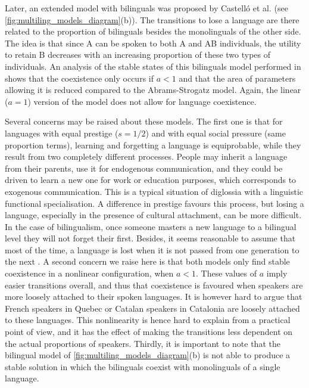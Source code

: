 \documentclass[../thesis.tex]{subfiles}
\begin{document}
Later, an extended model with bilinguals was proposed by Castell\'o et al.
\cite{CastelloOrderingDynamics2006} (see \cref{fig:multiling_models_diagram}(b)). The transitions
to lose a language are there related to the proportion of bilinguals besides the
monolinguals of the other side. The idea is that since A can be spoken to both A and AB
individuals, the utility to retain B decreases with an increasing proportion of these
two types of individuals. An analysis of the stable states of this bilinguals model
performed in \cite{VazquezAgentBased2010} shows that the coexistence only occurs if $a <
1$ and that the area of parameters allowing it is reduced compared to the
Abrams-Strogatz model. Again, the linear ($a = 1$) version of the model does not allow
for language coexistence.

Several concerns may be raised about these models. The first one is that for languages
with equal prestige ($s = 1/2$) and with equal social pressure (same proportion terms),
learning and forgetting a language is equiprobable, while they result from two
completely different processes. People may inherit a language from their parents, use it
for endogenous communication, and they could be driven to learn a new one for work or
education purposes, which corresponds to exogenous communication. This is a typical
situation of diglossia \cite{FergusonDiglossia1959} with a linguistic functional
specialisation. A difference in prestige favours this process, but losing a language,
especially in the presence of cultural attachment, can be more difficult. In the case of
bilingualism, once someone masters a new language to a bilingual level they will not
forget their first. Besides, it seems reasonable to assume that most of the time, a
language is lost when it is not passed from one generation to the next
\cite{CrystalLanguageDeath2000,PortesPluribusUnum1998}. A second concern we raise here
is that both models only find stable coexistence in a nonlinear configuration, when $a <
1$. These values of $a$ imply easier transitions overall, and thus that coexistence is
favoured when speakers are more loosely attached to their spoken languages. It is
however hard to argue that French speakers in Quebec or Catalan speakers in Catalonia
are loosely attached to these languages. This nonlinearity is hence hard to explain from
a practical point of view, and it has the effect of making the transitions less
dependent on the actual proportions of speakers. Thirdly, it is important to note that
the bilingual model of \cref{fig:multiling_models_diagram}(b) is not able to produce a stable
solution in which the bilinguals coexist with monolinguals of a single language.
\end{document}
